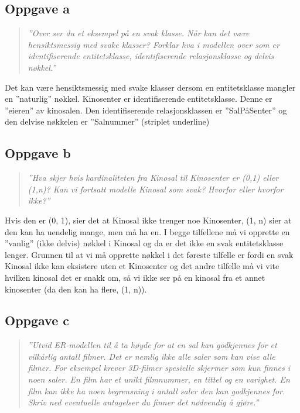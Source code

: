 \documentclass[12pt,a4paper]{article}
\begin{document}
		\subsection{Oppgave a}
			\begin{quote}
				\textit{
				''Over ser du et eksempel på en svak klasse. Når kan det være hensiktsmessig med
				svake klasser? Forklar hva i modellen over som er identifiserende entitetsklasse,
				identifiserende relasjonsklasse og delvis nøkkel.''			
				}
			\end{quote}						
			
			Det kan være hensiktsmessig med svake klasser dersom en entitetsklasse mangler en ''naturlig'' nøkkel. Kinosenter er identifiserende 									entitetsklasse. Denne er ''eieren'' av kinosalen. Den identifiserende relasjonsklassen er ''SalPåSenter'' og den delvise nøkkelen er ''Salnummer'' 					(striplet underline)
			
		\subsection{Oppgave b}
			\begin{quote}
				\textit{
					''Hva skjer hvis kardinaliteten fra Kinosal til Kinosenter er (0,1) eller (1,n)? Kan vi
					fortsatt modelle Kinosal som svak? Hvorfor eller hvorfor ikke?''				
				}
			\end{quote}
			
			Hvis den er (0, 1), sier det at Kinosal ikke trenger noe Kinosenter, (1, n) sier at den kan ha uendelig mange, men må ha en. I begge tilfellene må vi 					opprette en ''vanlig'' (ikke delvis) nøkkel i Kinosal og da er det ikke en svak entitetsklasse lenger. Grunnen til at vi må opprette nøkkel i det føreste 				tilfelle er fordi en svak Kinosal ikke kan eksistere uten et Kinosenter og det andre tilfelle må vi vite hvilken kinosal det er snakk om, så vi ikke ser på 				en kinosal fra et annet kinosenter (da den kan ha flere, (1, n)).
			
			\subsection{Oppgave c}
				\begin{quote}
					\textit{
						''Utvid ER-modellen til å ta høyde for at en sal kan godkjennes for et vilkårlig antall
						filmer. Det er nemlig ikke alle saler som kan vise alle filmer. For eksempel krever
						3D-filmer spesielle skjermer som kun finnes i noen saler. En film har et unikt
						filmnummer, en tittel og en varighet. En film kan ikke ha noen begrensning i antall
						saler den kan godkjennes for. Skriv ned eventuelle antagelser du finner det
						nødvendig å gjøre.''					
					}
				\end{quote}
				
\end{document}
